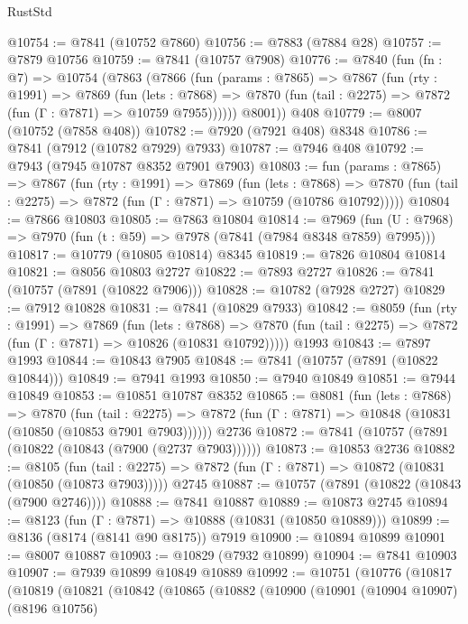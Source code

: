 \begin{lexlean}{RustStd}
\begin{coremodule}
{\begin{coremodule}
{{{{{{{{{{{{{{{{{{{{{{{{{{{{{{{{{{{{{{{{{{{{{{{{{{{{{{@10754 := @7841 (@10752 @7860)
@10756 := @7883 (@7884 @28)
@10757 := @7879 @10756
@10759 := @7841 (@10757 @7908)
@10776 := @7840
    (fun (fn : @7) =>
    @10754
      (@7863
        (@7866
          (fun (params : @7865) =>
          @7867
            (fun (rty : @1991) =>
            @7869
              (fun (lets : @7868) =>
              @7870 (fun (tail : @2275) => @7872 (fun (Γ : @7871) => @10759 @7955))))))
        @8001))
    @408
@10779 := @8007 (@10752 (@7858 @408))
@10782 := @7920 (@7921 @408) @8348
@10786 := @7841 (@7912 (@10782 @7929) @7933)
@10787 := @7946 @408
@10792 := @7943 (@7945 @10787 @8352 @7901 @7903)
@10803 := fun (params : @7865) =>
  @7867
    (fun (rty : @1991) =>
    @7869
      (fun (lets : @7868) =>
      @7870 (fun (tail : @2275) => @7872 (fun (Γ : @7871) => @10759 (@10786 @10792)))))
@10804 := @7866 @10803
@10805 := @7863 @10804
@10814 := @7969
    (fun (U : @7968) => @7970 (fun (t : @59) => @7978 (@7841 (@7984 @8348 @7859) @7995)))
@10817 := @10779 (@10805 @10814) @8345
@10819 := @7826 @10804 @10814
@10821 := @8056 @10803 @2727
@10822 := @7893 @2727
@10826 := @7841 (@10757 (@7891 (@10822 @7906)))
@10828 := @10782 (@7928 @2727)
@10829 := @7912 @10828
@10831 := @7841 (@10829 @7933)
@10842 := @8059
    (fun (rty : @1991) =>
    @7869
      (fun (lets : @7868) =>
      @7870 (fun (tail : @2275) => @7872 (fun (Γ : @7871) => @10826 (@10831 @10792)))))
    @1993
@10843 := @7897 @1993
@10844 := @10843 @7905
@10848 := @7841 (@10757 (@7891 (@10822 @10844)))
@10849 := @7941 @1993
@10850 := @7940 @10849
@10851 := @7944 @10849
@10853 := @10851 @10787 @8352
@10865 := @8081
    (fun (lets : @7868) =>
    @7870
      (fun (tail : @2275) =>
      @7872 (fun (Γ : @7871) => @10848 (@10831 (@10850 (@10853 @7901 @7903))))))
    @2736
@10872 := @7841 (@10757 (@7891 (@10822 (@10843 (@7900 (@2737 @7903))))))
@10873 := @10853 @2736
@10882 := @8105
    (fun (tail : @2275) => @7872 (fun (Γ : @7871) => @10872 (@10831 (@10850 (@10873 @7903)))))
    @2745
@10887 := @10757 (@7891 (@10822 (@10843 (@7900 @2746))))
@10888 := @7841 @10887
@10889 := @10873 @2745
@10894 := @8123 (fun (Γ : @7871) => @10888 (@10831 (@10850 @10889)))
@10899 := @8136 (@8174 (@8141 @90 @8175)) @7919
@10900 := @10894 @10899
@10901 := @8007 @10887
@10903 := @10829 (@7932 @10899)
@10904 := @7841 @10903
@10907 := @7939 @10899 @10849 @10889
@10992 := @10751
    (@10776
      (@10817
        (@10819
          (@10821
            (@10842
              (@10865
                (@10882
                  (@10900
                    (@10901
                      (@10904 @10907)
                      (@8196 @10756)
}}}}}}}}}}}}}}}}}}}}}}}}}}}}}}}}}}}}}}}}}}}}}}}}}}}}}}
\end{coremodule}}
\end{coremodule}
\end{lexlean}
